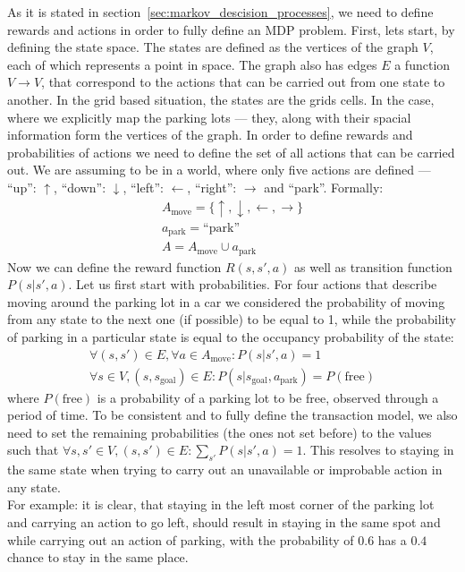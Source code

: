    As it is stated in section~\ref{sec:markov_descision_processes}, we need to define rewards and actions in order to fully define an MDP problem.
    First, lets start, by defining the state space. The states are defined as the vertices of the graph $V$, each of which represents a point in space. The graph also has edges $E$ a function $V \rightarrow V$, that correspond to the actions that can be carried out from one state to another. In the grid based situation, the states are the grids cells. In the case, where we explicitly map the parking lots --- they, along with their spacial information form the vertices of the graph.
    In order to define rewards and probabilities of actions we need to define the set of all actions that can be carried out. We are assuming to be in a world, where only five actions are defined --- ``up'': $\uparrow$,
    ``down'': $\downarrow$, ``left'': $\leftarrow$, ``right'': $\rightarrow$ and ``park''. Formally:
    \begin{eqnarray}
        A_{\mbox{move}} = \{ \uparrow, \downarrow, \leftarrow, \rightarrow \} \\
        a_{\mbox{park}} = \mbox{``park''} \\
        A = A_{\mbox{move}} \cup a_{\mbox{park}}
    \end{eqnarray}
    Now we can define the reward function $R(s, s', a)$ as well as transition function $P(s| s', a)$.
    Let us first start with probabilities. For four actions that describe moving around the parking lot in a car we considered the probability of moving from any state to the next one (if possible) to be equal to 1, while the probability of parking in a particular state is equal to the occupancy probability of the state:
    \begin{eqnarray}
        \forall (s, s') \in E, \forall a \in A_{\mbox{move}} : P(s| s', a) = 1 \\
        \forall s \in V, (s,s_{\mbox{goal}}) \in E : P(s| s_{\mbox{goal}}, a_{\mbox{park}}) = P(\mbox{free})
    \end{eqnarray}
    where $P(\mbox{free})$ is a probability of a parking lot to be free, observed through a period of time.
    To be consistent and to fully define the transaction model, we also need to set the remaining probabilities (the ones not set before) to the values such that $\forall s, s' \in V, (s, s') \in E : \sum_{s'}P(s| s', a) = 1$.
    This resolves to staying in the same state when trying to carry out an unavailable or improbable action in any state. \\
    For example: it is clear, that staying in the left most corner of the parking lot and carrying an action to go left, should result in staying in the same spot and while carrying out an action of parking, with the probability of $0.6$ has a $0.4$ chance to stay in the same place.

